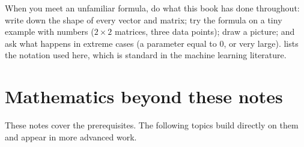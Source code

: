 \begin{remark}
When you meet an unfamiliar formula, do what this book has done throughout:
write down the shape of every vector and matrix; try the formula on a tiny
example with numbers ($2\times2$ matrices, three data points); draw a picture; and
ask what happens in extreme cases (a parameter equal to $0$, or very large).
 lists the notation used here, which is standard in the
machine learning literature.
\end{remark}

\section{Mathematics beyond these notes}\label{sec:beyond}

These notes cover the prerequisites. The following topics build directly on
them and appear in more advanced work.

